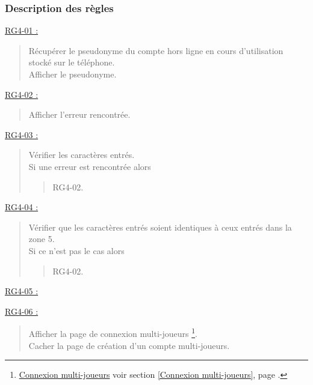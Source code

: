 \documentclass{report}
\begin{document}
		\subsubsection{Description des règles}

			\underline{RG4-01 :}
				\begin{quote}
					Récupérer le pseudonyme du compte hors ligne en cours d'utilisation stocké sur le téléphone.\\
					Afficher le pseudonyme.\\
				\end{quote}

			\underline{RG4-02 :}
				\begin{quote}
					Afficher l'erreur rencontrée.\\
				\end{quote}
				
			\underline{RG4-03 :}
				\begin{quote}
					Vérifier les caractères entrés.\\
					Si une erreur est rencontrée alors
					\begin{quote}
						RG4-02.
					\end{quote}
				\end{quote}
				
			\underline{RG4-04 :}
				\begin{quote}
					Vérifier que les caractères entrés soient identiques à ceux entrés dans la zone 5.\\
					Si ce n'est pas le cas alors
					\begin{quote}
						RG4-02.
					\end{quote}					
				\end{quote}	
				
			\underline{RG4-05 :}
				\begin{quote}
					
				\end{quote}
				
			\underline{RG4-06 :}
				\begin{quote}
					Afficher la page de connexion multi-joueurs%
						\footnote[1]{
							\hyperlink{Connexion multi-joueurs}{Connexion multi-joueurs}
							\og voir section \ref{Connexion multi-joueurs}, page \pageref{Connexion multi-joueurs}.\fg
						}.\\
					Cacher la page de création d'un compte multi-joueurs.\\
				\end{quote}
\end{document}
